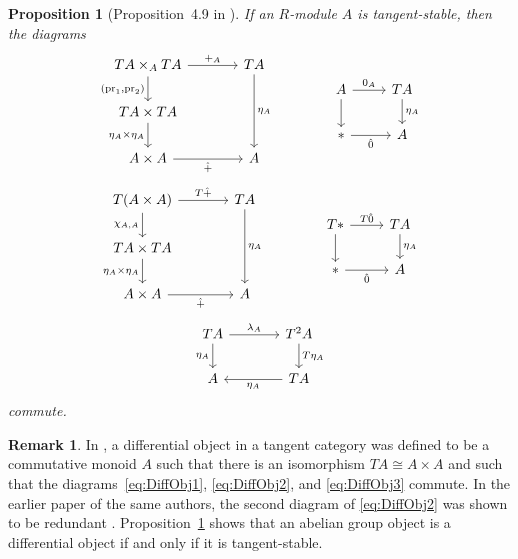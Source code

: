 \documentclass[12pt,reqno, a4paper]{amsart}
\numberwithin{equation}{section}
\theoremstyle{plain}
\newtheorem{Proposition}[Theorem]{Proposition}
\theoremstyle{definition}
\newtheorem{Remark}[Theorem]{Remark}
\theoremstyle{remark}
\newcommand{\pr}{\mathrm{pr}}
\newcommand{\Val}{\eta}
\newcommand{\Aadd}{\hat{+}}
\newcommand{\Azero}{\hat{0}}
\begin{document}
\begin{Proposition}[Proposition~4.9 in \cite{AintablianBlohmann:2026}]
\label{prop:TangStabDiffObj}
If an $R$-module $A$ is tangent-stable, then the diagrams
\begin{equation}
\label{eq:DiffObj1}
\begin{tikzcd}[column sep=large]
TA \times_A TA
\ar[r, "+_A"]
\ar[d, "{(\pr_1, \pr_2)}"']
&
TA
\ar[dd, "\Val_A"]
\\
TA \times TA
\ar[d, "\Val_A \times \Val_A"']
&
\\
A \times A
\ar[r, "\Aadd"']
&
A
\end{tikzcd}
\qquad\qquad
\begin{tikzcd}
A
\ar[r, "0_A"]
\ar[d]
&
TA
\ar[d, "\Val_A"]
\\
*
\ar[r, "\Azero"']
&
A
\end{tikzcd}
\end{equation}
\begin{equation}
\label{eq:DiffObj2}
\begin{tikzcd}[column sep=large]
T(A \times A)
\ar[r, "T\Aadd"]
\ar[d, "\chi_{A,A}"']
&
TA
\ar[dd, "\Val_A"]
\\
TA \times TA
\ar[d, "\Val_A \times \Val_A"']
\\
A \times A
\ar[r, "\Aadd"']
&
A
\end{tikzcd}
\qquad\qquad
\begin{tikzcd}
T*
\ar[r, "T\Azero"]
\ar[d]
&
TA
\ar[d, "\Val_A"]
\\
*
\ar[r, "\Azero"']
&
A
\end{tikzcd}
\end{equation}
\begin{equation}
\label{eq:DiffObj3}
\begin{tikzcd}[column sep=large]
TA
\ar[r, "\lambda_A"]
\ar[d, "\Val_A"']
&
T^2 A
\ar[d, "T\Val_A"]
\\
A
&
TA
\ar[l, "\Val_A"]
\end{tikzcd}
\end{equation}
commute.
\end{Proposition}

\begin{Remark}
In \cite[Def.~3.1]{CockettCruttwell:2018}, a differential object in a tangent category was defined to be a commutative monoid $A$ such that there is an isomorphism $TA \cong A \times A$ and such that the diagrams~\eqref{eq:DiffObj1}, \eqref{eq:DiffObj2}, and \eqref{eq:DiffObj3} commute. In the earlier paper \cite[Def.~4.8]{CockettCruttwell:2014} of the same authors, the second diagram of \eqref{eq:DiffObj2} was shown to be redundant \cite[Lem.~4.9]{CockettCruttwell:2014}. Proposition~\ref{prop:TangStabDiffObj} shows that an abelian group object is a differential object if and only if it is tangent-stable.
\end{Remark}
\end{document}
